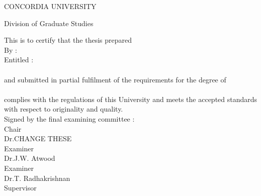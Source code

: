   \begin{titlepage}
     \vspace*{1ex}
     \begin{center}
        CONCORDIA UNIVERSITY
     \end{center}
     \begin{center}
        Division of Graduate Studies
     \end{center}
     \vspace{3ex}
     This is to certify that the thesis prepared\\[2ex]
     By :\hspace{40pt}{\bf Shayan Eskandari}\\[2ex]
     Entitled :\hspace*{13pt}{\bf Privacy and Usability:}\\ 
     \hspace*{62pt}{\bf on Bitcoin} \\[2ex]
    and submitted in partial fulfilment of the requirements for the degree
    of\\[2ex]
    \hspace*{62pt}{\bf Master of Computer and Electical Engineering}\\[2ex]
    complies with the regulations of this University and meets the accepted
    standards with respect to originality and quality. \\[2ex]
    Signed by the final examining committee : \\[5ex]
    \hspace*{77pt}\underline{\hspace{234pt}} Chair\\
    \hspace*{77pt}Dr.\@ CHANGE THESE\\[2.5ex]
    \hspace*{77pt}\underline{\hspace{234pt}} Examiner\\
    \hspace*{77pt}Dr.\@ J.W. Atwood\\[2.5ex]
    \hspace*{77pt}\underline{\hspace{234pt}} Examiner\\
    \hspace*{77pt}Dr.\@ T. Radhakrishnan\\[2.5ex]
    \hspace*{77pt}\underline{\hspace{234pt}} Supervisor \\

\end{titlepage}
